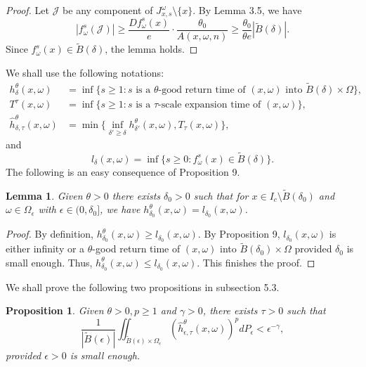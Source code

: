 \documentclass[11pt,oneside]{article}
\theoremstyle{plain}
\newtheorem{lem}{Lemma}[section]
\newtheorem{prop}{Proposition}
\numberwithin{equation}{section}
\numberwithin{figure}{section}
\numberwithin{table}{section}
\begin{document}
\begin{proof}
Let $\mathcal J$ be any component of $J^{\omega}_{x, s} \setminus \{ x\}$. By Lemma 3.5, we have
\[
|f_{\omega}^s (\mathcal J) | \geq \frac{Df_{\omega}^s (x)}{e} \cdot \frac{\theta_0}{A(x, \omega, n)} \geq \frac{\theta_0}{\theta e} |\tilde B(\delta)|. 
\]
Since $f_{\omega}^s(x) \in \tilde B(\delta)$, the lemma holds.

\end{proof}


We shall use the following notations:
\begin{align}
h^{\theta}_{\delta}(x, \omega)& = \inf \{s \geq 1: s \text{ is a $\theta$-good return time of $(x, \omega)$ into $\tilde B(\delta) \times \Omega$} \}, \\
T^{\tau}(x, \omega) & = \inf \{s \geq 1: s \text{ is a $\tau$-scale expansion time of $(x, \omega)$} \}, \\
\hat h^{\theta}_{\delta, \tau} (x, \omega) & = \min  \{ \inf_{\delta' \geq \delta} h^{\theta}_{\delta'}(x, \omega), T_{\tau}(x, \omega) \},
\end{align}
and
\begin{equation}
l_{\delta} (x, \omega) = \inf \{s \geq 0 : f_{\omega}^s(x) \in \tilde B(\delta) \}.
\end{equation}
The following is an easy consequence of Proposition 9.


\begin{lem}
Given $\theta >0$ there exists $\delta_0 > 0$ such that for $x \in I_c \setminus \tilde B(\delta_0)$ and $\omega \in \Omega_{\epsilon}$ with $\epsilon \in (0, \delta_0]$, we have $h^{\theta}_{\delta_0}(x, \omega)= l_{\delta_0} (x, \omega)$.
\end{lem}


\begin{proof}

By definition, $h^{\theta}_{\delta_0}(x, \omega) \geq  l_{\delta_0} (x, \omega)$. By Proposition 9, $l_{\delta_0} (x, \omega)$ is either infinity or a $\theta$-good return time of $(x, \omega)$ into $\tilde B(\delta_0) \times \Omega$ provided $\delta_0$ is small enough. Thus, $h^{\theta}_{\delta_0}(x, \omega) \leq  l_{\delta_0} (x, \omega)$. This finishes the proof.

\end{proof}


We shall prove the following two propositions in subsection 5.3.


\begin{prop}
Given $\theta > 0, p \geq 1$ and $\gamma > 0$, there exists $\tau > 0$ such that
\[
\frac{1}{|\tilde B(\epsilon)|} \iint_{\tilde B(\epsilon) \times \Omega_{\epsilon}} (\hat h^{\theta}_{\epsilon, \tau} (x, \omega) )^p dP_{\epsilon} < \epsilon^{- \gamma},
\]
provided $\epsilon > 0$ is small enough.
\end{prop}
\end{document}
